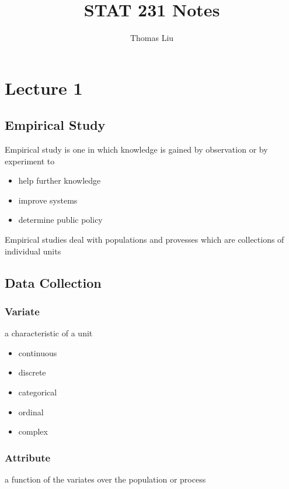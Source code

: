 \documentclass[11pt]{article}
\title{STAT 231 Notes}
\author{Thomas Liu}
\begin{document}
\maketitle
\tableofcontents

\newpage 

\section{Lecture 1}
\subsection{Empirical Study}
Empirical study is one in which knowledge is gained by observation or by experiment to 
\begin{itemize}
  \item help further knowledge 
  \item improve systems 
  \item determine public policy
\end{itemize}
Empirical studies deal with populations and provesses which are collections of individual units
\subsection{Data Collection}
\subsubsection{Variate}
a characteristic of a unit 
\begin{itemize}
  \item continuous
  \item discrete
  \item categorical
  \item ordinal
  \item complex
\end{itemize}
\subsubsection{Attribute}
a function of the variates over the population or process 
\end{document}
